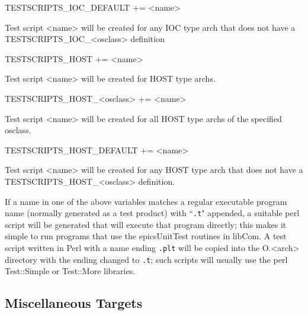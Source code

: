 \begin{description}\item TESTSCRIPTS\_IOC\_DEFAULT += \textless{}name\textgreater{}

\end{description}Test script \textless{}name\textgreater{} will be created for any IOC type arch that does not have a 
TESTSCRIPTS\_IOC\_\textless{}osclass\textgreater{} definition



\begin{description}\item {}TESTSCRIPTS\_HOST += \textless{}name\textgreater{}

\end{description}Test script \textless{}name\textgreater{} will be created for HOST type archs.

\begin{description}\item TESTSCRIPTS\_HOST\_\textless{}osclass\textgreater{} += \textless{}name\textgreater{}

\end{description}Test script \textless{}name\textgreater{} will be created for all HOST type archs of the specified osclass.

\begin{description}\item TESTSCRIPTS\_HOST\_DEFAULT += \textless{}name\textgreater{}

\end{description}Test script \textless{}name\textgreater{} will be created for any HOST type arch that does not have a 
TESTSCRIPTS\_HOST\_\textless{}osclass\textgreater{} definition.

If a name in one of the above variables matches a regular executable program name (normally generated as a test product) 
with ``\verb|.t|" appended, a suitable perl script will be generated that will execute that program directly; this makes it simple to 
run programs that use the epicsUnitTest routines in libCom.  A test script written in Perl with a name ending \verb|.plt| will be 
copied into the O.\textless{}arch\textgreater{} directory with the ending changed to \verb|.t|; such scripts will usually use the perl Test::Simple or 
Test::More libraries.

\subsection{Miscellaneous Targets}

